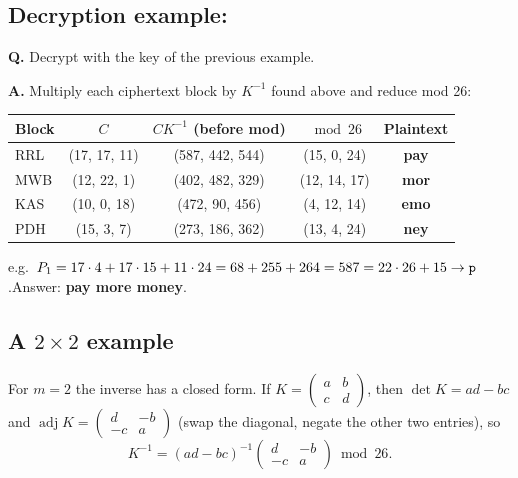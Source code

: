 \subsection{Decryption example: }
\begin{worked}[: lecture]
\textbf{Q.} Decrypt  with the key of the previous example.

\textbf{A.} Multiply each ciphertext block by $K^{-1}$ found above and reduce mod 26:
\begin{center}\small
\begin{tabular}{@{}lcccc@{}}
\toprule
Block & $C$ & $CK^{-1}$ (before mod) & $\bmod 26$ & Plaintext\\
\midrule
RRL & (17, 17, 11) & (587, 442, 544) & (15, 0, 24) & \textbf{pay}\\
MWB & (12, 22, 1) & (402, 482, 329) & (12, 14, 17) & \textbf{mor}\\
KAS & (10, 0, 18) & (472, 90, 456) & (4, 12, 14) & \textbf{emo}\\
PDH & (15, 3, 7) & (273, 186, 362) & (13, 4, 24) & \textbf{ney}\\
\bottomrule
\end{tabular}
\end{center}
e.g.\ $P_1 = 17\cdot4 + 17\cdot15 + 11\cdot24 = 68 + 255 + 264 = 587 = 22\cdot26 + 15 \to \texttt{p}$.\quad Answer: \textbf{pay more money}.
\end{worked}

\subsection{A $2\times2$ example}
For $m = 2$ the inverse has a closed form. If $K = \begin{pmatrix}a&b\\c&d\end{pmatrix}$, then $\det K = ad - bc$ and $\operatorname{adj}K = \begin{pmatrix}d&-b\\-c&a\end{pmatrix}$ (swap the diagonal, negate the other two entries), so
\[
K^{-1} = (ad - bc)^{-1}\begin{pmatrix}d&-b\\-c&a\end{pmatrix} \bmod 26 .
\]

